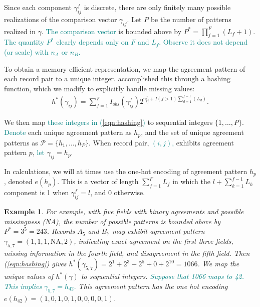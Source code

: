 \documentclass[ba]{imsart}
\newtheorem{example}{Example}
\begin{document}
Since each component $\gamma_{ij}^f$ is discrete, there are only finitely many possible realizations of the comparison vector $\gamma_{ij}$. Let $P$ be the number of patterns realized in $\gamma$. 
\textcolor{teal}{The comparison vector} is
 bounded above by $P^{*} =  \prod_{f=1}^F (L_f + 1).$
\textcolor{teal}{The quantity $P^{*}$ clearly depends only on $F$ and $L_f.$ Observe it does not depend (or scale) with $n_A$ or $n_B.$}

To obtain a memory efficient representation, we map the agreement pattern of each record pair to a unique integer. \cite{enamorado2019using} accomplished this through a hashing function, which we modify to explicitly handle missing values:
\begin{align}
	\label{eqn:hashing}
	h^{*}(\gamma_{ij}) = \sum_{f = 1}^F I_{obs}(\gamma_{ij}^f)2^{\gamma_{ij}^f + I(f>1)\sum_{d=1}^{f-1}(L_d)}.
\end{align}

We then map \textcolor{teal}{these integers in (\ref{eqn:hashing})} to sequential integers $\{1, \ldots, P\}$. \textcolor{teal}{Denote} each unique agreement pattern as $h_p$, and the set of unique agreement patterns as $\mathcal{P} = \{h_1, \ldots, h_P\}$. When record pair, \textcolor{teal}{$(i,j)$,} exhibits agreement pattern $p$, \textcolor{teal}{let} $\gamma_{ij} = h_p$. 

In calculations, we will at times use the one-hot encoding of agreement pattern $h_p$, denoted $e(h_p)$. This is a vector of length $\sum_{f=1}^F L_f$ in which the $l + \sum_{k=1}^{f-1} L_k$ component is 1 when $\gamma_{ij}^f = l$, and 0 otherwise. 


\begin{example}
\label{ex:one-hot}
For example, with five fields with binary agreements and possible missingness (NA), the number of possible patterns is bounded above by $P^{*} = 3^5 = 243$. Records $A_5$ and $B_7$ may exhibit agreement pattern $\gamma_{5,7} = (1, 1, 1, \text{NA}, 2)$, indicating exact agreement on the first three fields, missing information in the fourth field, and disagreement in the fifth field. Then (\ref{eqn:hashing}) gives $h^{*}(\gamma_{5,7}) = 2^1 + 2^3 + 2^5 + 0 + 2^{10} = 1066$. We map the unique values of $h^{*}(\gamma)$ to sequential integers. \textcolor{teal}{Suppose that 1066 maps to 42. This implies $\gamma_{5,7} = h_{42}.$}
This agreement pattern has the one hot encoding $e(h_{42}) = (1, 0, 1, 0, 1, 0, 0, 0, 0, 1)$.
\end{example}
\end{document}
